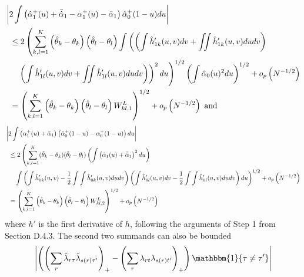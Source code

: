 \documentclass[12pt]{article}
\theoremstyle{definition}
\begin{document}
{\begin{align*}
&\left|2\int\left(\hat{\alpha}_1^{+}(u)  + \bar{\hat{\alpha}}_{1} - \alpha_1^{+}(u) - \bar{\alpha}_1 \right)\hat{\alpha}_0^{+}(1-u)du\right| \\
&\hspace{2mm}\leq 2\left(\sum_{k,l=1}^{K}\left(\hat{\theta}_{k}-\theta_{k}\right)\left(\hat{\theta}_{l}-\theta_{l}\right)\int \left(\left(\int \hat{h}'_{1k}(u,v)dv + \iint \hat{h}'_{1k}(u,v)dudv\right)\right.\right. \\
&\hspace{5mm}\left.\left.\left( \int  \hat{h}'_{1l}(u,v)dv + \iint \hat{h}'_{1l}(u,v)dudv\right)\right)^2du\right)^{1/2} \left(\int \hat{\alpha}_0(u)^{2}du\right)^{1/2} + o_{p}\left( N^{-1/2}\right) \\
&\hspace{2mm}=  \left(\sum_{k,l=1}^{K} \left(\hat{\theta}_{k} - \theta_{k}\right)\left(\hat{\theta}_{l} - \theta_{l}\right)W^{L}_{kl,1}\right)^{1/2}  + o_{p}\left( N^{-1/2}\right) \text{ and }
\end{align*}
\begin{align*}
&\left|2\int\left(\alpha_1^{+}(u) + \bar{\alpha}_1 \right)\left( \hat{\alpha}_0^{+}(1-u) -  \alpha_0^{+}(1-u)\right)du\right| \\
&\hspace{2mm}\leq 2 \left(\sum_{k,l=1}^{K}(\hat{\theta}_{k}- \theta_{k})(\hat{\theta}_{l}- \theta_{l})\left( \int \left( \hat{\alpha}_1(u) + \bar{\hat{\alpha}}_1\right)^2du\right) \right. \\
&\hspace{5mm}\left.\int \left(\int \hat{h}'_{0k}(u,v) - \frac{1}{2}\int\int \hat{h}'_{0k}(u,v)dudv\right)\left(\int \hat{h}'_{0l}(u,v)dv - \frac{1}{2}\int\int \hat{h}'_{0l}(u,v)dudv\right)du\right)^{1/2} + o_{p}\left( N^{-1/2}\right) \\
&\hspace{2mm}=  \left(\sum_{k,l=1}^{K} \left(\hat{\theta}_{k} - \theta_{k}\right)\left(\hat{\theta}_{l} - \theta_{l}\right)W^{L}_{kl,2}\right)^{1/2}  + o_{p}\left( N^{-1/2}\right)
\end{align*}
where $h'$ is the first derivative of $h$, following the arguments of Step 1 from Section D.4.3. The second two summands can also be bounded  
\begin{align*}
&\left|  \left(\left(\sum_r \hat{\lambda}_{r\tau}\hat{\lambda}_{s(r)\tau'}\right)_{+} - \left(\sum_r {\lambda}_{rt}{\lambda}_{s(r)t'}\right)_{+}\right)\mathbbm{1}\{\tau \neq \tau'\} \right| \\

\end{align*}}
\end{document}
